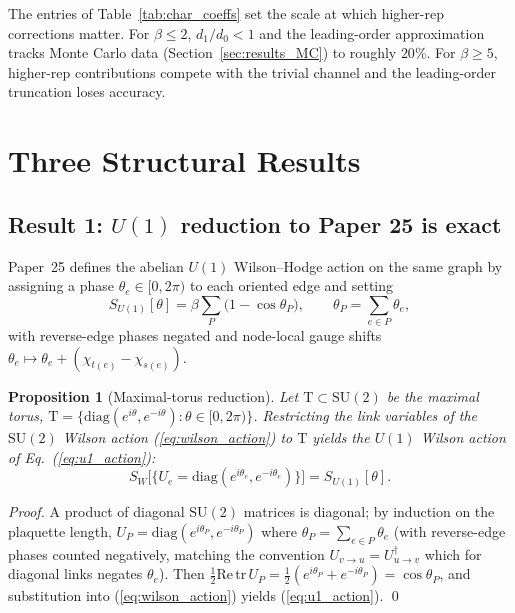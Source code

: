 \documentclass[11pt]{article}
\newtheorem{proposition}{Proposition}
\begin{document}
The entries of Table~\ref{tab:char_coeffs} set the scale at which
higher-rep corrections matter.  For $\beta \leq 2$, $d_1/d_0 < 1$ and
the leading-order approximation tracks Monte Carlo data
(Section~\ref{sec:results_MC}) to roughly $20\%$.  For $\beta \geq 5$,
higher-rep contributions compete with the trivial channel and the
leading-order truncation loses accuracy.

\section{Three Structural Results}
\label{sec:results}

\subsection{Result 1: $U(1)$ reduction to Paper 25 is exact}
\label{sec:u1_reduction}

Paper~25 defines the abelian $U(1)$ Wilson--Hodge action on the same
graph by assigning a phase $\theta_e \in [0, 2\pi)$ to each oriented
edge and setting
\begin{equation}
S_{U(1)}[\theta] = \beta \sum_P \bigl(1 - \cos \theta_P\bigr),
\qquad
\theta_P = \sum_{e \in P} \theta_e,
\label{eq:u1_action}
\end{equation}
with reverse-edge phases negated and node-local gauge shifts
$\theta_e \mapsto \theta_e + (\chi_{t(e)} - \chi_{s(e)})$.

\begin{proposition}[Maximal-torus reduction]
\label{prop:u1_reduction}
Let $\mathrm{T} \subset \mathrm{SU}(2)$ be the maximal torus,
$\mathrm{T} = \{\mathrm{diag}(e^{i\theta}, e^{-i\theta}) : \theta \in
[0, 2\pi)\}$.  Restricting the link variables of the
$\mathrm{SU}(2)$ Wilson action (\ref{eq:wilson_action}) to
$\mathrm{T}$ yields the $U(1)$ Wilson action of
Eq.~(\ref{eq:u1_action}):
\begin{equation}
S_W\bigl[\{U_e = \mathrm{diag}(e^{i\theta_e}, e^{-i\theta_e})\}\bigr]
= S_{U(1)}[\theta].
\label{eq:u1_reduction_claim}
\end{equation}
\end{proposition}

\begin{proof}
A product of diagonal $\mathrm{SU}(2)$ matrices is diagonal; by
induction on the plaquette length,
$U_P = \mathrm{diag}(e^{i\theta_P}, e^{-i\theta_P})$ where $\theta_P
= \sum_{e \in P} \theta_e$ (with reverse-edge phases counted
negatively, matching the convention $U_{v \to u} = U_{u \to v}^{\dagger}$
which for diagonal links negates $\theta_e$).  Then
$\tfrac{1}{2}\mathrm{Re}\,\mathrm{tr}\,U_P =
\tfrac{1}{2}(e^{i\theta_P} + e^{-i\theta_P}) = \cos \theta_P$, and
substitution into (\ref{eq:wilson_action}) yields (\ref{eq:u1_action}).
\qed
\end{proof}
\end{document}
